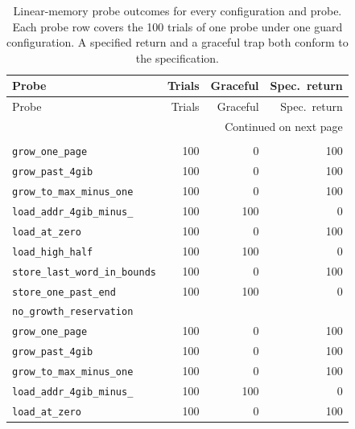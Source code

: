 {\scriptsize\setlength{\tabcolsep}{3pt}%
\begin{longtable}{lrrr}
\caption{Linear-memory probe outcomes for every configuration and probe. Each probe row covers the 100 trials of one probe under one guard configuration. A specified return and a graceful trap both conform to the specification.}\label{tab:rq2_outcomes}\\
\toprule
Probe & Trials & Graceful & Spec.\ return \\
\midrule
\endfirsthead
\toprule
Probe & Trials & Graceful & Spec.\ return \\
\midrule
\endhead
\midrule
\multicolumn{4}{r}{Continued on next page}\\
\endfoot
\bottomrule
\endlastfoot
\multicolumn{4}{l}{\texttt{default\_\allowbreak 2gib\_\allowbreak guard}} \\
\quad \texttt{grow\_\allowbreak one\_\allowbreak page} & 100 & 0 & 100 \\
\quad \texttt{grow\_\allowbreak past\_\allowbreak 4gib} & 100 & 0 & 100 \\
\quad \texttt{grow\_\allowbreak to\_\allowbreak max\_\allowbreak minus\_\allowbreak one} & 100 & 0 & 100 \\
\quad \texttt{load\_\allowbreak addr\_\allowbreak 4gib\_\allowbreak minus\_\allowbreak 4} & 100 & 100 & 0 \\
\quad \texttt{load\_\allowbreak at\_\allowbreak zero} & 100 & 0 & 100 \\
\quad \texttt{load\_\allowbreak high\_\allowbreak half} & 100 & 100 & 0 \\
\quad \texttt{store\_\allowbreak last\_\allowbreak word\_\allowbreak in\_\allowbreak bounds} & 100 & 0 & 100 \\
\quad \texttt{store\_\allowbreak one\_\allowbreak past\_\allowbreak end} & 100 & 100 & 0 \\
\midrule
\multicolumn{4}{l}{\texttt{no\_\allowbreak growth\_\allowbreak reservation}} \\
\quad \texttt{grow\_\allowbreak one\_\allowbreak page} & 100 & 0 & 100 \\
\quad \texttt{grow\_\allowbreak past\_\allowbreak 4gib} & 100 & 0 & 100 \\
\quad \texttt{grow\_\allowbreak to\_\allowbreak max\_\allowbreak minus\_\allowbreak one} & 100 & 0 & 100 \\
\quad \texttt{load\_\allowbreak addr\_\allowbreak 4gib\_\allowbreak minus\_\allowbreak 4} & 100 & 100 & 0 \\
\quad \texttt{load\_\allowbreak at\_\allowbreak zero} & 100 & 0 & 100 \\

\end{longtable}}
